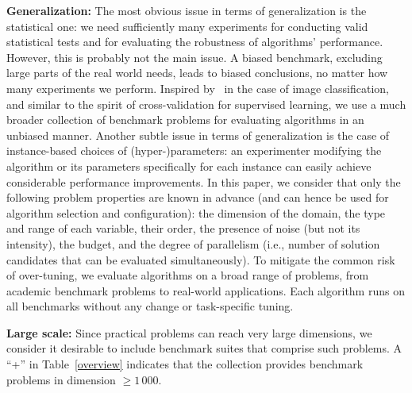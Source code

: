 {\textbf{Generalization:}} The most obvious issue in terms of generalization is the statistical one: we need sufficiently many experiments for conducting valid statistical tests and for evaluating the robustness of algorithms' performance. However, this is probably not the main issue. A biased benchmark, excluding large parts of the real world needs, leads to biased conclusions, no matter how many experiments we perform. Inspired by~\cite{cifargeneralize} in the case of image classification, {and similar to the spirit of cross-validation for supervised learning}, we use 
a much broader collection of benchmark problems for evaluating algorithms in an unbiased manner. 
Another subtle issue in terms of generalization is the case of instance-based choices of (hyper-)parameters: an experimenter modifying the algorithm or its parameters specifically for each instance can easily achieve considerable performance improvements. In this paper, we consider that only the following problem properties are known in advance (and can hence be used for algorithm selection and configuration): the dimension of the domain, the type and range of each variable, their order, the presence of noise (but not its intensity), the budget, and the degree of parallelism (i.e., number of solution candidates that can be evaluated simultaneously). 
To mitigate the common risk of over-tuning, we evaluate algorithms on a broad range of problems, from academic benchmark problems to real-world applications. Each algorithm runs on all benchmarks without any change or task-specific tuning. 

\textbf{Large scale:} Since practical problems can reach very large dimensions, we consider it desirable to include benchmark suites that comprise such problems. A ``+'' in Table~\ref{overview} indicates that the collection provides benchmark problems in dimension  $\geq1\,000$.   

